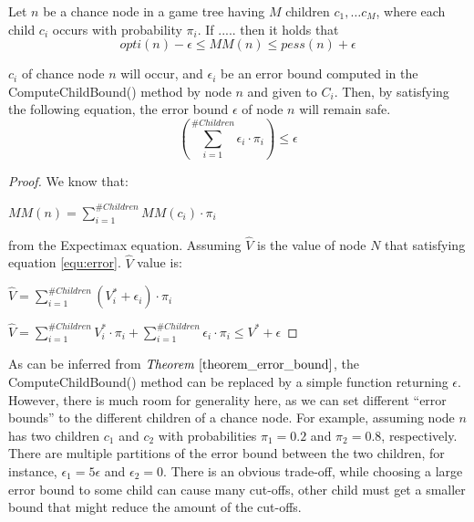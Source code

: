 \begin{theorem}
\label{theorem_error_bound}
Let $n$ be a chance node in a game tree
having $M$ children $c_1,\ldots c_M$, 
where each child $c_i$ occurs with probability $\pi_i$. 
If .....
then it holds that 
\[opti(n)-\epsilon \leq MM(n)\leq pess(n)+\epsilon\]


$c_i$ of chance node $n$ will occur, and $\epsilon _i$ be an error bound computed in the ComputeChildBound() method by node $n$ and given to $C_i$. Then, by satisfying the following equation, the error bound $\epsilon$ of node $n$ will remain safe.
\begin{equation} 
\label{equ:error}
	\left ( {\sum_{i=1}^{\#Children}{{\epsilon _i}\cdot{\pi _i}}} \right ) \leq {\epsilon } 
\end{equation}
\end{theorem}



\begin{proof}
We know that:

$MM(n)={\sum_{i=1}^{\#Children}{{MM(c_i)}\cdot{\pi _i}}}$

from the Expectimax equation. Assuming $\hat{V}$ is the value of node $N$ that satisfying equation \ref{equ:error}. $\hat{V}$ value is:

$\hat{V}={\sum_{i=1}^{\#Children}{({V ^* _i}+{\epsilon _i})\cdot{\pi _i}}}$

$\hat{V}={\sum_{i=1}^{\#Children}{{V ^* _i}\cdot{\pi _i}}}+{\sum_{i=1}^{\#Children}{{\epsilon _i}\cdot{\pi _i}}} \leq V^*+\epsilon$


\end{proof}

As can be inferred from $\mathit{Theorem~\ref{theorem_error_bound}}$, the ComputeChildBound() method can be replaced by a simple function returning $\epsilon$. 
However, there is much room for generality here, as we can set different ``error bounds'' to the different children of a chance node. For example, assuming node $n$ has two children $c_1$ and $c_2$ with probabilities $\pi_1=0.2$ and $\pi_2=0.8$, respectively. There are multiple partitions of the error bound between the two children, for instance, $\epsilon_1=5\epsilon$ and $\epsilon_2=0$. There is an obvious trade-off, while choosing a large error bound to some child can cause many cut-offs, other child must get a smaller bound that might reduce the amount of the cut-offs.


